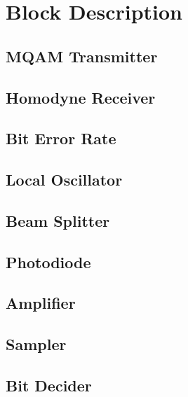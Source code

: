 \documentclass[a4paper]{article}
\begin{document}
\pagebreak


\section{Block Description}

\subsection{MQAM Transmitter}

\subsection{Homodyne Receiver}



\subsection{Bit Error Rate}


\subsection{Local Oscillator}


\subsection{Beam Splitter}


\subsection{Photodiode}


\subsection{Amplifier}


\subsection{Sampler}


\subsection{Bit Decider}

\end{document}
